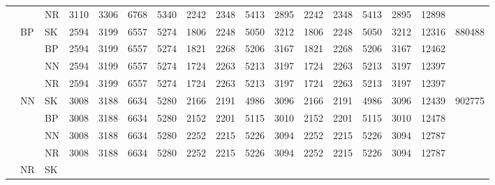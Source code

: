 \documentclass[../main/main.tex]{subfiles}
\begin{document}
\begin{table}
\begin{adjustbox}{max width=\textwidth}
\begin{threeparttable}
\begin{tabular}{cllcccccccccccccc}
                      &      & NR   &
                3110  & 3306 & 6768 & 5340 &
                2242  & 2348 & 5413 & 2895 &
                2242  & 2348 & 5413 & 2895 &
                12898 &
                \\ \cmidrule(lr){2-17}
                       & \multirow{4}{*}{BP}     & SK   &
                2594   & 3199                    & 6557 & 5274 &
                1806   & 2248                    & 5050 & 3212 &
                1806   & 2248                    & 5050 & 3212 &
                12316  & \multirow{4}{*}{880488}
                \\
                      &      & BP   &
                2594  & 3199 & 6557 & 5274 &
                1821  & 2268 & 5206 & 3167 &
                1821  & 2268 & 5206 & 3167 &
                12462 &
                \\
                      &      & NN   &
                2594  & 3199 & 6557 & 5274 &
                1724  & 2263 & 5213 & 3197 &
                1724  & 2263 & 5213 & 3197 &
                12397 &
                \\
                      &      & NR   &
                2594  & 3199 & 6557 & 5274 &
                1724  & 2263 & 5213 & 3197 &
                1724  & 2263 & 5213 & 3197 &
                12397 &
                \\ \cmidrule(lr){2-17}
                      & \multirow{4}{*}{NN}     & SK   &
                3008  & 3188                    & 6634 & 5280 &
                2166  & 2191                    & 4986 & 3096 &
                2166  & 2191                    & 4986 & 3096 &
                12439 & \multirow{4}{*}{902775}
                \\
                      &      & BP   &
                3008  & 3188 & 6634 & 5280 &
                2152  & 2201 & 5115 & 3010 &
                2152  & 2201 & 5115 & 3010 &
                12478 &
                \\
                      &      & NN   &
                3008  & 3188 & 6634 & 5280 &
                2252  & 2215 & 5226 & 3094 &
                2252  & 2215 & 5226 & 3094 &
                12787 &
                \\
                      &      & NR   &
                3008  & 3188 & 6634 & 5280 &
                2252  & 2215 & 5226 & 3094 &
                2252  & 2215 & 5226 & 3094 &
                12787 &
                \\ \cmidrule(lr){2-17}
                      & \multirow{4}{*}{NR}     & SK   &

\end{tabular}
\end{threeparttable}
\end{adjustbox}
\end{table}
\end{document}
